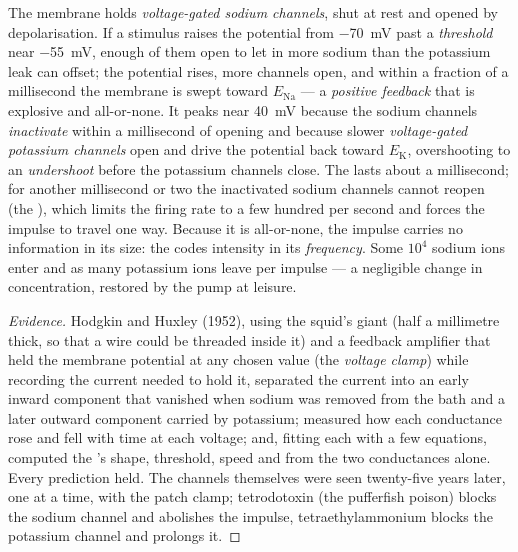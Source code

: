 \begin{proposition}\label{prop:b2:neurons-synapses:ap}
The  membrane holds \emph{voltage-gated sodium channels}, shut
at rest and opened by depolarisation. If a stimulus raises the
potential from \qty{-70}{mV} past a \emph{threshold} near
\qty{-55}{mV}, enough of them open to let in more sodium than the
potassium leak can offset; the potential rises, more channels open,
and within a fraction of a millisecond the membrane is swept toward
$E_{\mathrm{Na}}$ --- a \emph{positive feedback} that is explosive
and all-or-none. It peaks near \qty{+40}{mV} because the sodium
channels \emph{inactivate} within a millisecond of opening and
because slower \emph{voltage-gated potassium channels} open and
drive the potential back toward $E_{\mathrm K}$, overshooting to an
\emph{undershoot} before the potassium channels close. The
\emph{} lasts about a millisecond; for another
millisecond or two the inactivated sodium channels cannot reopen
(the \emph{}), which limits the firing rate to a
few hundred per second and forces the impulse to travel one way.
Because it is all-or-none, the impulse carries no information in its
size: the  codes intensity in its \emph{frequency}. Some
$10^{4}$ sodium ions enter and as many potassium ions leave per
impulse --- a negligible change in concentration, restored by the
pump at leisure.
\end{proposition}
\begin{proof}[Evidence]
Hodgkin and Huxley (1952), using the squid's giant  (half a
millimetre thick, so that a wire could be threaded inside it) and a
feedback amplifier that held the membrane potential at any chosen
value (the \emph{voltage clamp}) while recording the current needed
to hold it, separated the current into an early inward component
that vanished when sodium was removed from the bath and a later
outward component carried by potassium; measured how each
conductance rose and fell with time at each voltage; and, fitting
each with a few equations, computed the 's shape,
threshold, speed and  from the two conductances
alone. Every prediction held. The channels themselves were seen
twenty-five years later, one at a time, with the patch clamp;
tetrodotoxin (the pufferfish poison) blocks the sodium channel
and abolishes the impulse, tetraethylammonium blocks the potassium
channel and prolongs it.
\end{proof}

